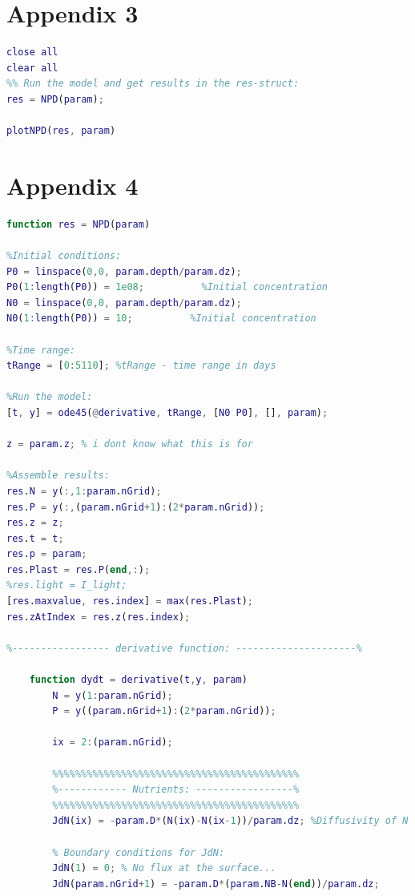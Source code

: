 \section{Appendix 3}
\begin{lstlisting}[language=Matlab, caption = baserun.m - used to run the model and get results in a struct called res]
close all
clear all
%% Run the model and get results in the res-struct:
res = NPD(param);

plotNPD(res, param)
\end{lstlisting}

\section{Appendix 4}
\begin{lstlisting}[language=Matlab, caption = NPD.m - the body of the model that calculates the derivative of the ODEs]
function res = NPD(param)

%Initial conditions:
P0 = linspace(0,0, param.depth/param.dz);
P0(1:length(P0)) = 1e08;          %Initial concentration
N0 = linspace(0,0, param.depth/param.dz);
N0(1:length(P0)) = 10;          %Initial concentration

%Time range:
tRange = [0:5110]; %tRange - time range in days

%Run the model:
[t, y] = ode45(@derivative, tRange, [N0 P0], [], param);

z = param.z; % i dont know what this is for

%Assemble results:
res.N = y(:,1:param.nGrid);
res.P = y(:,(param.nGrid+1):(2*param.nGrid));
res.z = z;
res.t = t;
res.p = param;
res.Plast = res.P(end,:);
%res.light = I_light;
[res.maxvalue, res.index] = max(res.Plast);
res.zAtIndex = res.z(res.index);

%----------------- derivative function: ---------------------%

    function dydt = derivative(t,y, param)
        N = y(1:param.nGrid);
        P = y((param.nGrid+1):(2*param.nGrid));
        
        ix = 2:(param.nGrid);
        
        %%%%%%%%%%%%%%%%%%%%%%%%%%%%%%%%%%%%%%%%%%%
        %------------ Nutrients: -----------------%
        %%%%%%%%%%%%%%%%%%%%%%%%%%%%%%%%%%%%%%%%%%%
        JdN(ix) = -param.D*(N(ix)-N(ix-1))/param.dz; %Diffusivity of N
        
        % Boundary conditions for JdN:
        JdN(1) = 0; % No flux at the surface...
        JdN(param.nGrid+1) = -param.D*(param.NB-N(end))/param.dz;


\end{lstlisting}

